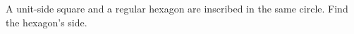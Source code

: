 A unit-side square and a regular hexagon are inscribed in the same circle. Find the hexagon's side.
